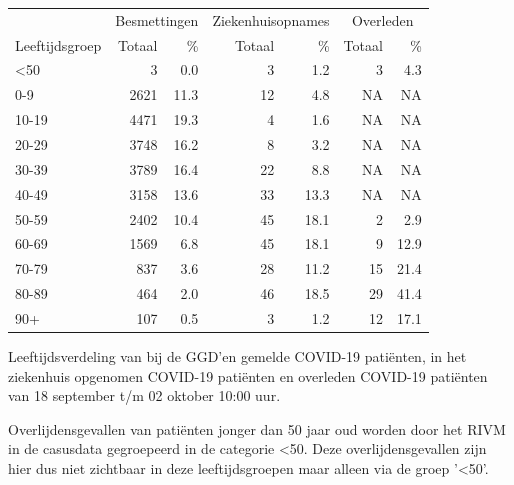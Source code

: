 \documentclass[
  english,
  man,floatsintext]{apa6}
\begin{document}
\begin{table}
\centering\begingroup\fontsize{11}{13}\selectfont

\begin{threeparttable}
\begin{tabular}{lrrrrrr}
\toprule
\multicolumn{1}{c}{ } & \multicolumn{2}{c}{Besmettingen} & \multicolumn{2}{c}{Ziekenhuisopnames} & \multicolumn{2}{c}{Overleden} \\
\cmidrule(l{3pt}r{3pt}){2-3} \cmidrule(l{3pt}r{3pt}){4-5} \cmidrule(l{3pt}r{3pt}){6-7}
Leeftijdsgroep & Totaal & \% & Totaal & \% & Totaal & \%\\
\midrule
<50 & 3 & 0.0 & 3 & 1.2 & 3 & 4.3\\
0-9 & 2621 & 11.3 & 12 & 4.8 & NA & NA\\
10-19 & 4471 & 19.3 & 4 & 1.6 & NA & NA\\
20-29 & 3748 & 16.2 & 8 & 3.2 & NA & NA\\
30-39 & 3789 & 16.4 & 22 & 8.8 & NA & NA\\
40-49 & 3158 & 13.6 & 33 & 13.3 & NA & NA\\
50-59 & 2402 & 10.4 & 45 & 18.1 & 2 & 2.9\\
60-69 & 1569 & 6.8 & 45 & 18.1 & 9 & 12.9\\
70-79 & 837 & 3.6 & 28 & 11.2 & 15 & 21.4\\
80-89 & 464 & 2.0 & 46 & 18.5 & 29 & 41.4\\
90+ & 107 & 0.5 & 3 & 1.2 & 12 & 17.1\\
\bottomrule
\end{tabular}
\begin{tablenotes}
\item[1] Leeftijdsverdeling van bij de GGD’en gemelde COVID-19 patiënten, in het ziekenhuis opgenomen COVID-19 patiënten en overleden COVID-19 patiënten van 18 september t/m 02 oktober 10:00 uur.
\item[2] Overlijdensgevallen van patiënten jonger dan 50 jaar oud worden door het RIVM in de casusdata gegroepeerd in de categorie <50. Deze overlijdensgevallen zijn hier dus niet zichtbaar in deze leeftijdsgroepen maar alleen via de groep '<50'.
\end{tablenotes}
\end{threeparttable}
\endgroup{}
\end{table}

\newpage
\end{document}
